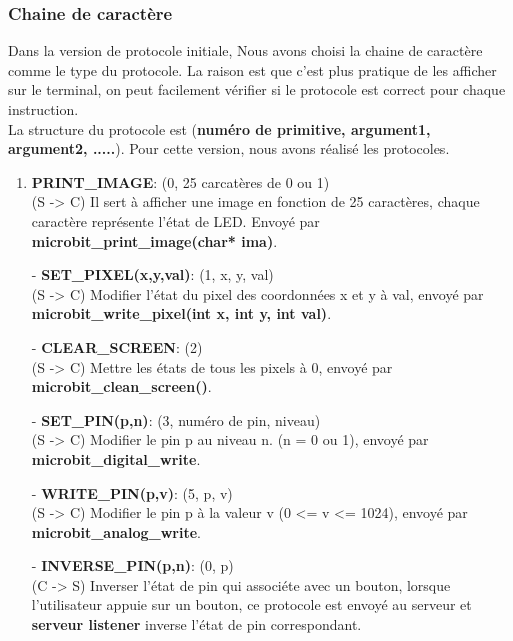 \documentclass[14px]{article}
\begin{document}
\subsubsection{Chaine de caractère} 
Dans la version de protocole initiale, Nous avons choisi la chaine de caractère comme le type du protocole. La raison est que c'est plus pratique de les afficher sur le terminal, on peut facilement vérifier si le protocole est correct pour chaque instruction. \\
La structure du protocole est (\textbf{numéro de primitive, argument1, argument2, .....}).
Pour cette version, nous avons réalisé les protocoles.
\begin{enumerate}
	\item \textbf{PRINT\_IMAGE}: (0, 25 carcatères de 0 ou 1)\\
	(S -> C) Il sert à afficher une image en fonction de 25 caractères, chaque caractère représente l'état de LED. Envoyé par \textbf{microbit\_print\_image(char* ima)}.
	\item[-] \textbf{SET\_PIXEL(x,y,val)}: (1, x, y, val)\\
	(S -> C) Modifier l'état du pixel des coordonnées x et y à val, envoyé par \textbf{microbit\_write\_pixel(int x, int y, int val)}.
	\item[-] \textbf{CLEAR\_SCREEN}: (2)\\
	(S -> C) Mettre les états de tous les pixels à 0, envoyé par \textbf{microbit\_clean\_screen()}.
	\item[-] \textbf{SET\_PIN(p,n)}: (3, numéro de pin, niveau)\\
	(S -> C) Modifier le pin p au niveau n. (n = 0 ou 1), envoyé par \textbf{microbit\_digital\_write}.
	\item[-] \textbf{WRITE\_PIN(p,v)}: (5, p, v)\\
	(S -> C) Modifier le pin p à la valeur v (0 <= v <= 1024), envoyé par \textbf{microbit\_analog\_write}.\\
	
	\item[-] \textbf{INVERSE\_PIN(p,n)}: (0, p)\\
	(C -> S) Inverser l'état de pin qui associéte avec un bouton, lorsque l'utilisateur appuie sur un bouton, ce protocole est envoyé au serveur et \textbf{serveur listener} inverse l'état de pin correspondant. 
\end{enumerate}
\end{document}
